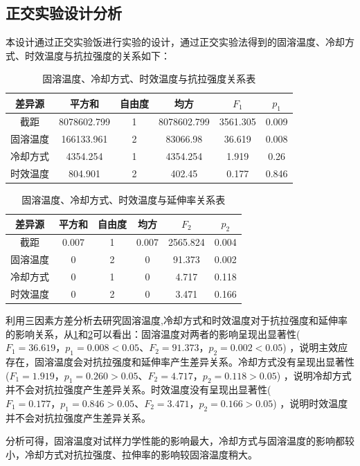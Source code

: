 \subsection{正交实验设计分析}
本设计通过正交实验饭进行实验的设计，通过正交实验法得到的固溶温度、冷却方式、时效温度与抗拉强度的关系如下：
\begin{table}[htbp]
	\centering
	\caption{固溶温度、冷却方式、时效温度与抗拉强度关系表}
	\label{sec:zjq}
	\begin{tabular}{cccccc}
		\toprule
		差异源 & 平方和 & 自由度 & 均方 & $ F_1 $ & $ p_1 $ \\
		\midrule
		截距 & 8078602.799 & 1 & 8078602.799 & 3561.305 & 0.009 \\
		固溶温度 & 166133.961 & 2 & 83066.98 & 36.619 & 0.008 \\
		冷却方式 & 4354.254 & 1 & 4354.254 & 1.919 & 0.26 \\
		时效温度 & 804.901 & 2 & 402.45 & 0.177 & 0.846 \\
		\bottomrule
	\end{tabular}
\end{table}
\begin{table}[htbp]
	\centering
	\caption{固溶温度、冷却方式、时效温度与延伸率关系表}
	\label{sec:zjy}
	\begin{tabular}{cccccc}
		\toprule
		差异源 & 平方和 & 自由度 & 均方 & $ F_2 $ & $ p_2 $ \\
		\midrule
		截距 & 0.007 & 1 & 0.007 & 2565.824 & 0.004 \\
		固溶温度 & 0 & 2 & 0 & 91.373 & 0.002 \\
		冷却方式 & 0 & 1 & 0 & 4.717 & 0.118 \\
		时效温度 & 0 & 2 & 0 & 3.471 & 0.166 \\
		\bottomrule
	\end{tabular}
\end{table}

利用三因素方差分析去研究固溶温度,冷却方式和时效温度对于抗拉强度和延伸率的影响关系，从\ref{sec:zjq}和\ref{sec:zjy}可以看出：固溶温度对两者的影响呈现出显著性($ F_1 =36.619，p_1=0.008< 0.05 $、$ F_2 =91.373，p_2=0.002< 0.05 $) ，说明主效应存在，固溶温度会对抗拉强度和延伸率产生差异关系。冷却方式没有呈现出显著性($ F_1=1.919，p_1 =0.260>0.05 $、$ F_2=4.717，p_2=0.118>0.05 $) ，说明冷却方式并不会对抗拉强度产生差异关系。时效温度没有呈现出显著性($ F_1=0.177，p_1=0.846>0.05 $、$ F_2=3.471，p_2 =0.166>0.05 $) ，说明时效温度并不会对抗拉强度产生差异关系。

分析可得，固溶温度对试样力学性能的影响最大，冷却方式与固溶温度的影响都较小，冷却方式对抗拉强度、拉伸率的影响较固溶温度稍大。

